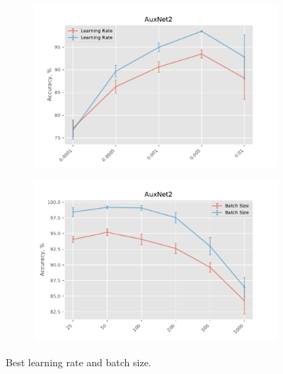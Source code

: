 \documentclass[10pt,conference,compsocconf]{IEEEtran}
\begin{document}
\begin{figure}
    \centering
    \begin{subfigure}[b]{0.475\textwidth}
        \centering
        \includegraphics[width=\textwidth]{learning_rates.pdf}
        \label{fig:learning_rates}
    \end{subfigure}
    \hfill
    \begin{subfigure}[b]{0.475\textwidth}  
        \centering 
        \includegraphics[width=\textwidth]{batch_sizes.pdf}
        \label{fig:batch_sizes}
    \end{subfigure}
    \caption[ Best learning rate and batch size. ]
    {\small Best learning rate and batch size.} 
    \label{fig:lr and bs}
\end{figure}
\end{document}
